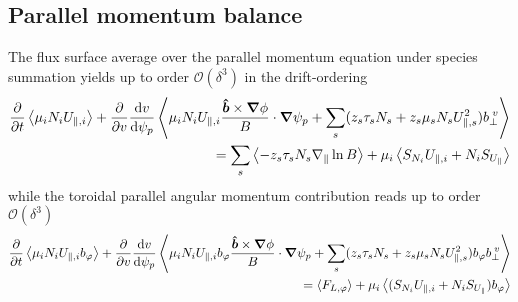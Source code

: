 \subsection{Parallel momentum balance}
The flux surface average over the parallel momentum equation under species summation  yields up to order $\mathcal O(\delta^3)$ in the drift-ordering
\begin{align}
  \frac{\partial}{\partial t}\left \langle \mu_iN_iU_{\parallel,i}  \right \rangle
    + \frac{\partial}{\partial v} \frac{\mathrm{d} v}{\mathrm{d}\psi_p} \left \langle \mu_iN_iU_{\parallel,i} \frac{\bm{\hat{b}}\times{\boldsymbol{\nabla}}\phi}{B}\cdot{\boldsymbol{\nabla}}\psi_p + \sum_s (z_s\tau_sN_s + z_s\mu_s N_sU_{\parallel,s}^2) b_{\perp}^{\;v}   \right \rangle
    \nonumber\\
   = \sum_s\left \langle -z_s\tau_s N_s\nabla_\parallel \ln B \right \rangle + \mu_i \left \langle  S_{N_i} U_{\parallel,i} + N_i S_{U_\parallel} \right \rangle
   \label{eq:parallel_momentum}
\end{align}
while the toroidal parallel angular momentum contribution reads up to order $\mathcal O(\delta^3)$
\begin{align}\label{eq:parallel_momentum_direction}
    \frac{\partial}{\partial t}  \left \langle \mu_iN_iU_{\parallel,i} b_\varphi \right \rangle
    + \frac{\partial}{\partial v} \frac{\mathrm{d} v}{\mathrm{d}\psi_p} \left \langle \mu_iN_iU_{\parallel,i} b_\varphi\frac{\bm{\hat{b}}\times{\boldsymbol{\nabla}}\phi}{B}\cdot{\boldsymbol{\nabla}}\psi_p + \sum_s (z_s\tau_s N_s + z_s\mu_sN_sU_{\parallel,s}^2) b_\varphi b_{\perp}^{\;v}  \right \rangle
    \nonumber\\
    = \left \langle F_{L,\varphi} \right \rangle + \mu_i \left \langle  (S_{N_i} U_{\parallel,i} + N_i S_{U_\parallel}) b_\varphi \right \rangle
\end{align}

